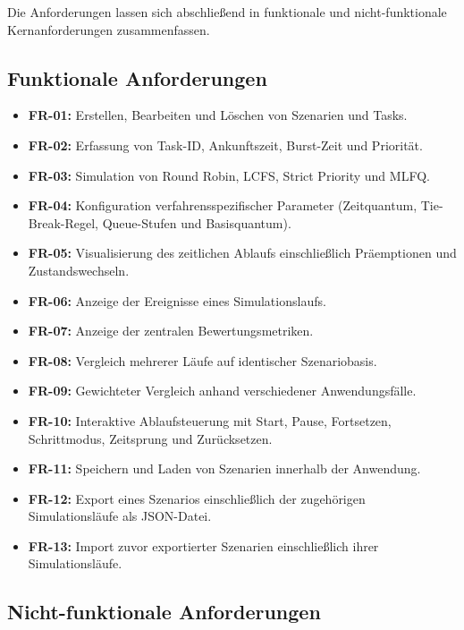 Die Anforderungen lassen sich abschließend in funktionale und nicht-funktionale Kernanforderungen zusammenfassen.

\subsection{Funktionale Anforderungen}

\begin{itemize}
    \item \textbf{FR-01:} Erstellen, Bearbeiten und Löschen von Szenarien und Tasks.
    \item \textbf{FR-02:} Erfassung von Task-ID, Ankunftszeit, Burst-Zeit und Priorität.
    \item \textbf{FR-03:} Simulation von Round Robin, LCFS, Strict Priority und MLFQ.
    \item \textbf{FR-04:} Konfiguration verfahrensspezifischer Parameter (Zeitquantum, Tie-Break-Regel, Queue-Stufen und Basisquantum).
    \item \textbf{FR-05:} Visualisierung des zeitlichen Ablaufs einschließlich Präemptionen und Zustandswechseln.
    \item \textbf{FR-06:} Anzeige der Ereignisse eines Simulationslaufs.
    \item \textbf{FR-07:} Anzeige der zentralen Bewertungsmetriken.
    \item \textbf{FR-08:} Vergleich mehrerer Läufe auf identischer Szenariobasis.
    \item \textbf{FR-09:} Gewichteter Vergleich anhand verschiedener Anwendungsfälle.
    \item \textbf{FR-10:} Interaktive Ablaufsteuerung mit Start, Pause, Fortsetzen, Schrittmodus, Zeitsprung und Zurücksetzen.
    \item \textbf{FR-11:} Speichern und Laden von Szenarien innerhalb der Anwendung.
    \item \textbf{FR-12:} Export eines Szenarios einschließlich der zugehörigen Simulationsläufe als JSON-Datei.
    \item \textbf{FR-13:} Import zuvor exportierter Szenarien einschließlich ihrer Simulationsläufe.
\end{itemize}

\subsection{Nicht-funktionale Anforderungen}


